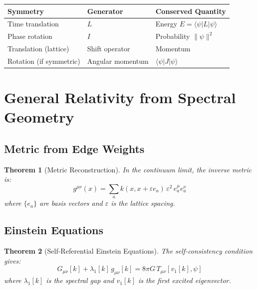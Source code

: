 \documentclass[11pt,a4paper]{article}
\theoremstyle{plain}
\newtheorem{theorem}{Theorem}[section]
\theoremstyle{definition}
\theoremstyle{remark}
\begin{document}
\begin{table}[H]
\centering
\begin{tabular}{@{}lll@{}}
\toprule
\textbf{Symmetry} & \textbf{Generator} & \textbf{Conserved Quantity} \\
\midrule
Time translation & $L$ & Energy $E = \langle\psi|L|\psi\rangle$ \\
Phase rotation & $I$ & Probability $\|\psi\|^2$ \\
Translation (lattice) & Shift operator & Momentum \\
Rotation (if symmetric) & Angular momentum & $\langle\psi|J|\psi\rangle$ \\
\bottomrule
\end{tabular}
\end{table}

\section{General Relativity from Spectral Geometry}

\subsection{Metric from Edge Weights}

\begin{theorem}[Metric Reconstruction]
In the continuum limit, the inverse metric is:
\begin{equation}
g^{\mu\nu}(x) = \sum_a k(x, x+\varepsilon e_a)\, \varepsilon^2\, e_a^\mu e_a^\nu
\end{equation}
where $\{e_a\}$ are basis vectors and $\varepsilon$ is the lattice spacing.
\end{theorem}

\subsection{Einstein Equations}

\begin{theorem}[Self-Referential Einstein Equations]
The self-consistency condition gives:
\begin{equation}
\boxed{G_{\mu\nu}[k] + \lambda_1[k]\, g_{\mu\nu}[k] = 8\pi G\, T_{\mu\nu}[v_1[k], \psi]}
\end{equation}
where $\lambda_1[k]$ is the spectral gap and $v_1[k]$ is the first excited eigenvector.
\end{theorem}
\end{document}
